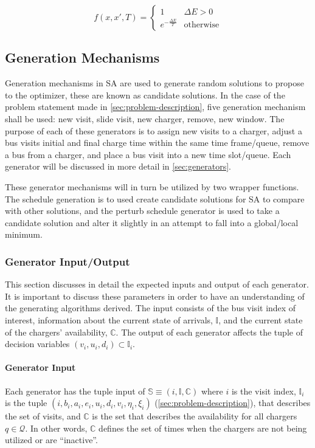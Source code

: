 \documentclass[11pt,a4paper,final]{article}
\newcommand{\visit}{(i, b_i, a_i, e_i, u_i, d_i, v_i, \eta_i, \xi_i)}
\newcommand{\I}{\mathbb{I}}                 %
\newcommand{\C}{\mathbb{C}}                 %
\newcommand{\Sol}{\mathbb{S}}               %
\newcommand{\Qset}{\mathcal{Q}}             %
\begin{document}
\begin{equation}
\label{eq:candaccept}
f(x,x',T) =
\begin{cases}
  1                 & \Delta E > 0 \\
  e^{- \frac{\Delta E}{T}} & \text{otherwise}
\end{cases}
\end{equation}

\subsection{Generation Mechanisms}
\label{sec:generation-mechanisms}
Generation mechanisms in SA are used to generate random solutions to propose to the optimizer, these are known as
candidate solutions. In the case of the problem statement made in \ref{sec:problem-description}, five generation mechanism
shall be used: new visit, slide visit, new charger, remove, new window. The purpose of each of these generators is to
assign new visits to a charger, adjust a bus visits initial and final charge time within the same time frame/queue,
remove a bus from a charger, and place a bus visit into a new time slot/queue. Each generator will be discussed in more
detail in \ref{sec:generators}.

These generator mechanisms will in turn be utilized by two wrapper functions. The schedule generation is to used create
candidate solutions for SA to compare with other solutions, and the perturb schedule generator is used to take a
candidate solution and alter it slightly in an attempt to fall into a global/local minimum.

\subsubsection{Generator Input/Output}
\label{sec:generator-input-output}
This section discusses in detail the expected inputs and output of each generator. It is important to discuss these
parameters in order to have an understanding of the generating algorithms derived. The input consists of the bus visit
index of interest, information about the current state of arrivals, \(\I\), and the current state of the chargers'
availability, \(\C\). The output of each generator affects the tuple of decision variables \((v_i, u_i, d_i) \subset \I_i\).

\paragraph{Generator Input}
\label{sec:orgb022f37}
Each generator has the tuple input of \(\Sol \equiv (i, \I, \C)\) where \(i\) is the visit index, \(\I_i\) is the tuple \(\visit\)
(\ref{sec:problem-description}), that describes the set of visits, and \(\C\) is the set that describes the availability for
all chargers \(q \in \Qset\). In other words, \(\C\) defines the set of times when the chargers are not being utilized or are
``inactive''.
\end{document}
